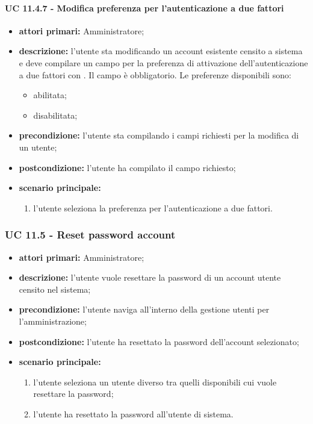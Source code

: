 				\paragraph{UC 11.4.7 - Modifica preferenza per l'autenticazione a due fattori}
				\begin{itemize}
					\item \textbf{attori primari:} Amministratore;
					\item \textbf{descrizione:} l'utente sta modificando un account esistente censito a sistema e deve compilare un campo per la preferenza di attivazione dell'autenticazione a due fattori con . Il campo è obbligatorio. Le preferenze disponibili sono:
					\begin{itemize}
						\item abilitata;
						\item disabilitata;
					\end{itemize}
					\item \textbf{precondizione:} l'utente sta compilando i campi richiesti per la modifica di un utente;
					\item \textbf{postcondizione:} l'utente ha compilato il campo richiesto;
					\item \textbf{scenario principale:}
					\begin{enumerate}
						\item{l'utente seleziona la preferenza per l'autenticazione a due fattori.}
					\end{enumerate}	
				\end{itemize}



			\subsubsection{UC 11.5 - Reset password account}
			\begin{itemize}
				\item \textbf{attori primari:} Amministratore;
				\item \textbf{descrizione:} l'utente vuole resettare la password di un account utente censito nel sistema;
				\item \textbf{precondizione:} l'utente naviga all'interno della gestione utenti per l'amministrazione;
				\item \textbf{postcondizione:} l'utente ha resettato la password dell'account selezionato;
				\item \textbf{scenario principale:}
				\begin{enumerate}
					\item{l'utente seleziona un utente diverso tra quelli disponibili cui vuole resettare la password;}
					\item{l'utente ha resettato la password all'utente di sistema.}
				\end{enumerate}		
			\end{itemize}

